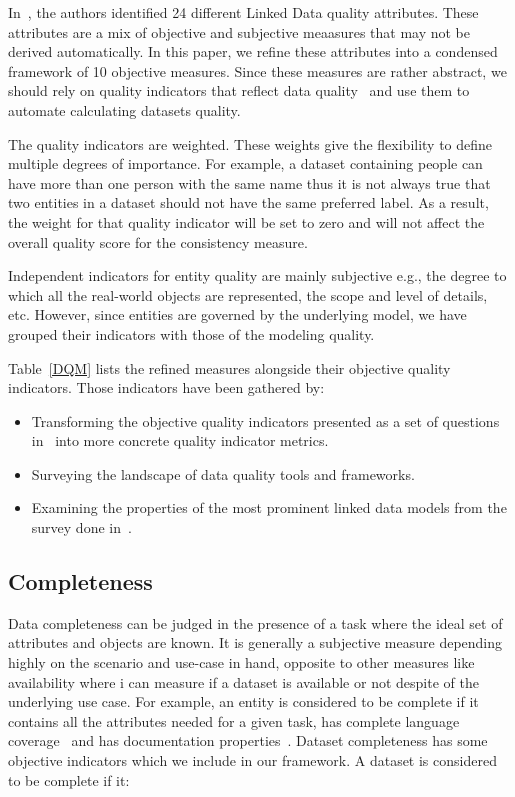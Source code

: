 \documentclass[onecolumn, crcready]{../../Tools/LaTEX/iosart2c}
\begin{document}
In~\cite{Assaf:DQMST:12}, the authors identified 24 different Linked Data quality attributes. These attributes are a mix of objective and subjective meaasures that may not be derived automatically. In this paper, we refine these attributes into a condensed framework of 10 objective measures. Since these measures are rather abstract, we should rely on quality indicators that reflect data quality~\cite{Flemming:Thesis:10} and use them to automate calculating datasets quality.

The quality indicators are weighted. These weights give the flexibility to define multiple degrees of importance. For example, a dataset containing people can have more than one person with the same name thus it is not always true that two entities in a dataset should not have the same preferred label. As a result, the weight for that quality indicator will be set to zero and will not affect the overall quality score for the consistency measure.

Independent indicators for entity quality are mainly subjective e.g., the degree to which all the real-world objects are represented, the scope and level of details, etc. However, since entities are governed by the underlying model, we have grouped their indicators with those of the modeling quality.

Table~\ref{DQM} lists the refined measures alongside their objective quality indicators. Those indicators have been gathered by:

\begin{itemize}
	\item Transforming the objective quality indicators presented as a set of questions in~\cite{Assaf:DQMST:12} into more concrete quality indicator metrics.
	\item Surveying the landscape of data quality tools and frameworks.
	\item Examining the properties of the most prominent linked data models from the survey done in~\cite{Assaf:PROFILES:15}.
\end{itemize}

\subsection{Completeness}
Data completeness can be judged in the presence of a task where the ideal set of attributes and objects are known. It is generally a subjective measure depending highly on the scenario and use-case in hand, opposite to other measures like availability where i can measure if a dataset is available or not despite of the underlying use case. For example, an entity is considered to be complete if it contains all the attributes needed for a given task, has complete language coverage~\cite{Mader:TBDL:12} and has documentation properties~\cite{Miles:W3C:09,Mader:TBDL:12}. Dataset completeness has some objective indicators which we include in our framework. A dataset is considered to be complete if it:
\end{document}
